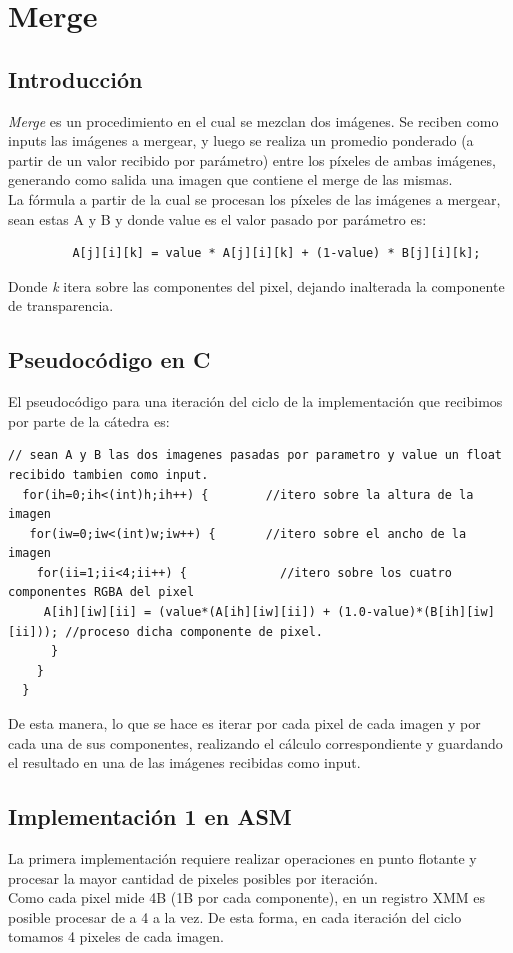 \section{Merge}
\subsection{Introducción}
\textit{Merge} es un procedimiento en el cual se mezclan dos imágenes. Se reciben como inputs las imágenes a mergear, y luego se realiza un promedio ponderado (a partir de un valor recibido por parámetro) entre los píxeles de ambas imágenes, generando como salida una imagen que contiene el merge de las mismas.\\
La fórmula a partir de la cual se procesan los píxeles de las imágenes a mergear, sean estas A y B y donde value es el valor pasado por parámetro es:  

\begin{verbatim}
         A[j][i][k] = value * A[j][i][k] + (1-value) * B[j][i][k];
\end{verbatim}

Donde \textit{k} itera sobre las componentes del pixel, dejando inalterada la componente de transparencia.

\subsection{Pseudocódigo en C}

El pseudocódigo para una iteración del ciclo de la implementación que recibimos por parte de la cátedra es:

\begin{lstlisting}
// sean A y B las dos imagenes pasadas por parametro y value un float recibido tambien como input.
  for(ih=0;ih<(int)h;ih++) {		//itero sobre la altura de la imagen
   for(iw=0;iw<(int)w;iw++) {		//itero sobre el ancho de la imagen
    for(ii=1;ii<4;ii++) {			  //itero sobre los cuatro componentes RGBA del pixel
     A[ih][iw][ii] = (value*(A[ih][iw][ii]) + (1.0-value)*(B[ih][iw][ii])); //proceso dicha componente de pixel.
      }
    }
  }

\end{lstlisting}

De esta manera, lo que se hace es iterar por cada pixel de cada imagen y por cada una de sus componentes, realizando el cálculo correspondiente y guardando el resultado en una de las imágenes recibidas como input.

\subsection{Implementación 1 en ASM}
La primera implementación requiere realizar operaciones en punto flotante y procesar la mayor cantidad de pixeles posibles por iteración.\\
Como cada pixel mide 4B (1B por cada componente), en un registro XMM es posible procesar de a 4 a la vez. De esta forma, en cada iteración del ciclo tomamos 4 pixeles de cada imagen.

